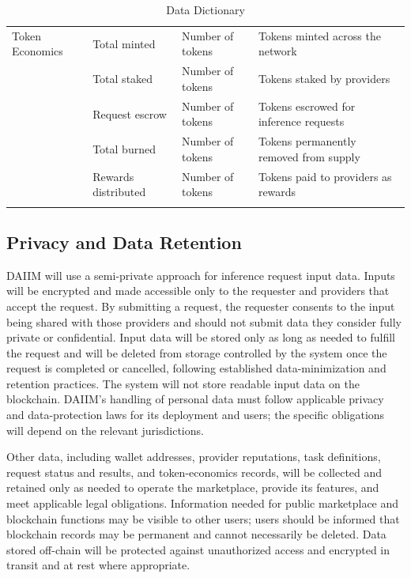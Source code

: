 \documentclass[12pt]{article}
\begin{document}
\begin{longtable}{p{} p{} p{} p{}}
Token Economics & Total minted & Number of tokens & Tokens minted across the network\\
 & Total staked & Number of tokens & Tokens staked by providers\\
 & Request escrow & Number of tokens & Tokens escrowed for inference requests\\
 & Total burned & Number of tokens & Tokens permanently removed from supply\\
 & Rewards distributed & Number of tokens & Tokens paid to providers as rewards\\
\bottomrule
\caption{Data Dictionary} \label{tab:DataDictionary}
\end{longtable}
\setlength{\tabcolsep}{6pt}

\subsection{Privacy and Data Retention}

DAIIM will use a semi-private approach for inference request input data. Inputs
will be encrypted and made accessible only to the requester and providers that
accept the request. By submitting a request, the requester consents to the
input being shared with those providers and should not submit data they
consider fully private or confidential. Input data will be stored only as long
as needed to fulfill the request and will be deleted from storage controlled by
the system once the request is completed or cancelled, following established
data-minimization and retention practices. The system will not store readable
input data on the blockchain. DAIIM's handling of personal data must follow
applicable privacy and data-protection laws for its deployment and users; the
specific obligations will depend on the relevant jurisdictions.

Other data, including wallet addresses, provider reputations, task definitions,
request status and results, and token-economics records, will be collected and
retained only as needed to operate the marketplace, provide its features, and
meet applicable legal obligations. Information needed for public marketplace
and blockchain functions may be visible to other users; users should be
informed that blockchain records may be permanent and cannot necessarily be
deleted. Data stored off-chain will be protected against unauthorized access
and encrypted in transit and at rest where appropriate.

\end{document}
